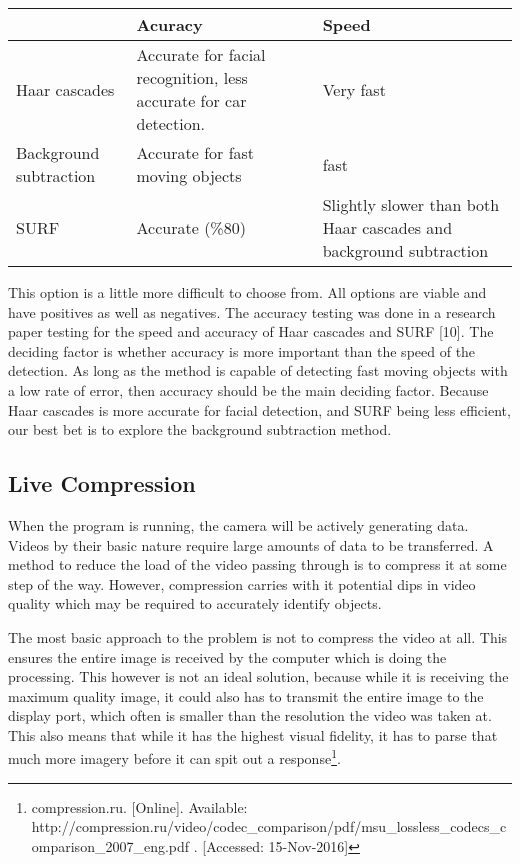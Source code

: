 \documentclass[letterpaper,10pt,onecolumn,draftclsnofoot]{IEEEtran}
\begin{document}
\begin{center}
	\begin{tabular}{|p{4cm}|p{5cm}|p{4cm}|}
		
		\hline
		\textbf{} & \textbf{Acuracy} & \textbf{Speed} \\
		\hline
		Haar cascades & Accurate for facial recognition, less accurate for car detection. & Very fast \\
		\hline
		Background subtraction & Accurate for fast moving objects & fast \\
		\hline
		SURF & Accurate (\%80)  & Slightly slower than both Haar cascades and background subtraction \\
		\hline
		
	\end{tabular}
\end{center}

This option is a little more difficult to choose from.
All options are viable and have positives as well as negatives.
The accuracy testing was done in a research paper testing for the speed and accuracy of Haar cascades and SURF [10].
The deciding factor is whether accuracy is more important than the speed of the detection.
As long as the method is capable of detecting fast moving objects with a low rate of error, then accuracy should be the main deciding factor.
Because Haar cascades is more accurate for facial detection, and SURF being less efficient, our best bet is to explore the background subtraction method.

\newpage
\subsection{Live Compression} %

When the program is running, the camera will be actively generating data.  Videos by their basic nature require large amounts of data to be transferred.  A method to reduce the load of the video passing through is to compress it at some step of the way.  However, compression carries with it potential dips in video quality which may be required to accurately identify objects.

The most basic approach to the problem is not to compress the video at all.  This ensures the entire image is received by the computer which is doing the processing.  This however is not an ideal solution, because while it is receiving the maximum quality image, it could also has to transmit the entire image to the display port, which often is smaller than the resolution the video was taken at.  This also means that while it has the highest visual fidelity, it has to parse that much more imagery before it can spit out a response\footnote{compression.ru. [Online]. Available: http://compression.ru/video/codec\_comparison/pdf/msu\_lossless\_codecs\_comparison\_2007\_eng.pdf . [Accessed: 15-Nov-2016] }. 
\end{document}
